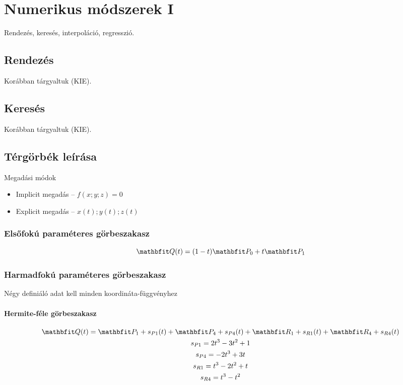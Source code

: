 \documentclass[../../main.tex]{subfiles}
\begin{document}
\newpage

\section{Numerikus módszerek I}

\begin{fulltheorem}
  Rendezés, keresés, interpoláció, regresszió.
\end{fulltheorem}

\subsection{Rendezés}

Korábban tárgyaltuk (KIE).

\subsection{Keresés}

Korábban tárgyaltuk (KIE).

\subsection{Térgörbék leírása}

Megadási módok
\begin{itemize}
  \item Implicit megadás -- $f(x;y;z) = 0$
  \item Explicit megadás -- $x(t) ; y(t); z(t)$
\end{itemize}

\subsubsection{Elsőfokú paraméteres görbeszakasz}
\[
  \rvec Q(t) = (1-t) \rvec P_0 + t \rvec P_1
\]

\subsubsection{Harmadfokú paraméteres görbeszakasz}

Négy definiáló adat kell minden koordináta-függvényhez

\paragraph{Hermite-féle görbeszakasz}
\begin{gather*}
  \rvec Q(t)
  = \rvec P_1 + s_{P1}(t)
  + \rvec P_4 + s_{P4}(t)
  + \rvec R_1 + s_{R1}(t)
  + \rvec R_4 + s_{R4}(t)
  \\
  s_{P1} = 2t^3 - 3t^2 + 1
  \\
  s_{P4} = -2t^3 + 3t
  \\
  s_{R1} = t^3 - 2t^2 + t
  \\
  s_{R4} = t^3 - t^2
\end{gather*}
\end{document}
